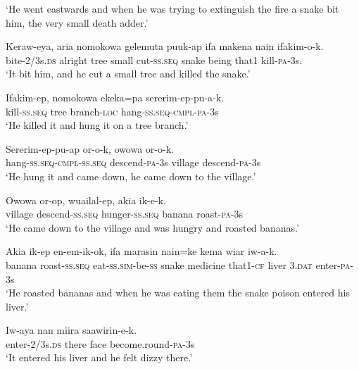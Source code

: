 \glt ‘He went eastwards and when he was trying to extinguish the fire a snake bit him, the very small death adder.’ \\
\z


\ea
\gll  Keraw-eya,  aria  nomokowa  gelemuta  puuk-ap  ifa  makena  nain  ifakim-o-k. \\
bite-2/3s.\textsc{ds}  alright  tree  small  cut-\textsc{ss.seq}  snake  being      that1  kill-\textsc{pa}-3s. \\


\glt ‘It bit him, and he cut a small tree and killed the snake.’ \\
\z


\ea
\gll  Ifakim-ep,  nomokowa  ekeka=pa  sererim-ep-pu-a-k. \\
kill-\textsc{ss.seq}  tree  branch-\textsc{loc}  hang-\textsc{ss.seq}-\textsc{cmpl}-\textsc{pa}-3s \\
\glt ‘He killed it and hung it on a tree branch.’ \\
\z


\ea
\gll  Sererim-ep-pu-ap  or-o-k,  owowa  or-o-k. \\
hang-\textsc{ss.seq}-\textsc{cmpl}-\textsc{ss.seq}  descend-\textsc{pa}-3s  village  descend-\textsc{pa}-3s \\
\glt ‘He hung it and came down, he came down to the village.’ \\
\z


\ea
\gll  Owowa  or-op,  wuailal-ep,  akia  ik-e-k. \\
village  descend-\textsc{ss.seq}  hunger-\textsc{ss.seq}  banana  roast-\textsc{pa}-3s \\
\glt ‘He came down to the village and was hungry and roasted bananas.’ \\
\z


\ea
\gll  Akia  ik-ep  en-em-ik-ok,  ifa  marasin  nain=ke              kema  wiar  iw-a-k. \\
banana  roast-\textsc{ss.seq}  eat-\textsc{ss}.\textsc{sim}-be-\textsc{ss}  snake  medicine  that1-\textsc{cf}   liver  3.\textsc{dat}  enter-\textsc{pa}-3s \\


\glt ‘He roasted bananas and when he was eating them the snake poison entered his liver.’ \\
\z


\ea
\gll  Iw-aya  nan  miira  saawirin-e-k. \\
enter-2/3s.\textsc{ds}  there  face  become.round-\textsc{pa}-3s \\
\glt ‘It entered his liver and he felt dizzy there.’ \\
\z


